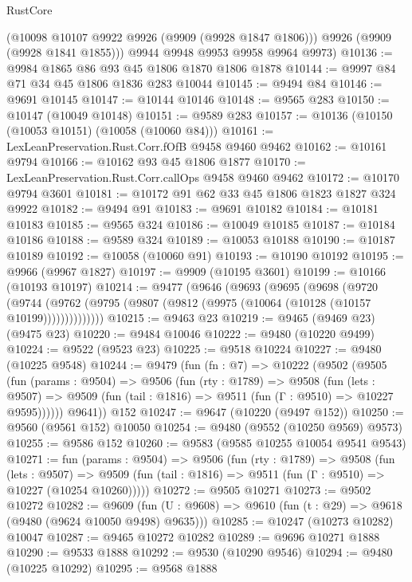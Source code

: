 \begin{lexlean}{RustCore}
\begin{coremodule}
        (@10098 @10107 @9922 @9926 (@9909 (@9928 @1847 @1806)))
        @9926
        (@9909 (@9928 @1841 @1855)))
      @9944
      @9948
      @9953
      @9958
      @9964
      @9973)
@10136 := @9984 @1865 @86 @93 @45 @1806 @1870 @1806 @1878
@10144 := @9997 @84 @71 @34 @45 @1806 @1836 @283 @10044
@10145 := @9494 @84
@10146 := @9691 @10145
@10147 := @10144 @10146
@10148 := @9565 @283
@10150 := @10147 (@10049 @10148)
@10151 := @9589 @283
@10157 := @10136 (@10150 (@10053 @10151) (@10058 (@10060 @84)))
@10161 := LexLeanPreservation.Rust.Corr.fOfB @9458 @9460 @9462
@10162 := @10161 @9794
@10166 := @10162 @93 @45 @1806 @1877
@10170 := LexLeanPreservation.Rust.Corr.callOps @9458 @9460 @9462
@10172 := @10170 @9794 @3601
@10181 := @10172 @91 @62 @33 @45 @1806 @1823 @1827 @324 @9922
@10182 := @9494 @91
@10183 := @9691 @10182
@10184 := @10181 @10183
@10185 := @9565 @324
@10186 := @10049 @10185
@10187 := @10184 @10186
@10188 := @9589 @324
@10189 := @10053 @10188
@10190 := @10187 @10189
@10192 := @10058 (@10060 @91)
@10193 := @10190 @10192
@10195 := @9966 (@9967 @1827)
@10197 := @9909 (@10195 @3601)
@10199 := @10166 (@10193 @10197)
@10214 := @9477
    (@9646
      (@9693
        (@9695
          (@9698
            (@9720
              (@9744 (@9762 (@9795 (@9807 (@9812 (@9975 (@10064 (@10128 (@10157 @10199))))))))))))))
@10215 := @9463 @23
@10219 := @9465 (@9469 @23) (@9475 @23)
@10220 := @9484 @10046
@10222 := @9480 (@10220 @9499)
@10224 := @9522 (@9523 @23)
@10225 := @9518 @10224
@10227 := @9480 (@10225 @9548)
@10244 := @9479
    (fun (fn : @7) =>
    @10222
      (@9502
        (@9505
          (fun (params : @9504) =>
          @9506
            (fun (rty : @1789) =>
            @9508
              (fun (lets : @9507) =>
              @9509 (fun (tail : @1816) => @9511 (fun (Γ : @9510) => @10227 @9595))))))
        @9641))
    @152
@10247 := @9647 (@10220 (@9497 @152))
@10250 := @9560 (@9561 @152) @10050
@10254 := @9480 (@9552 (@10250 @9569) @9573)
@10255 := @9586 @152
@10260 := @9583 (@9585 @10255 @10054 @9541 @9543)
@10271 := fun (params : @9504) =>
  @9506
    (fun (rty : @1789) =>
    @9508
      (fun (lets : @9507) =>
      @9509 (fun (tail : @1816) => @9511 (fun (Γ : @9510) => @10227 (@10254 @10260)))))
@10272 := @9505 @10271
@10273 := @9502 @10272
@10282 := @9609
    (fun (U : @9608) => @9610 (fun (t : @29) => @9618 (@9480 (@9624 @10050 @9498) @9635)))
@10285 := @10247 (@10273 @10282) @10047
@10287 := @9465 @10272 @10282
@10289 := @9696 @10271 @1888
@10290 := @9533 @1888
@10292 := @9530 (@10290 @9546)
@10294 := @9480 (@10225 @10292)
@10295 := @9568 @1888

\end{coremodule}
\end{lexlean}
